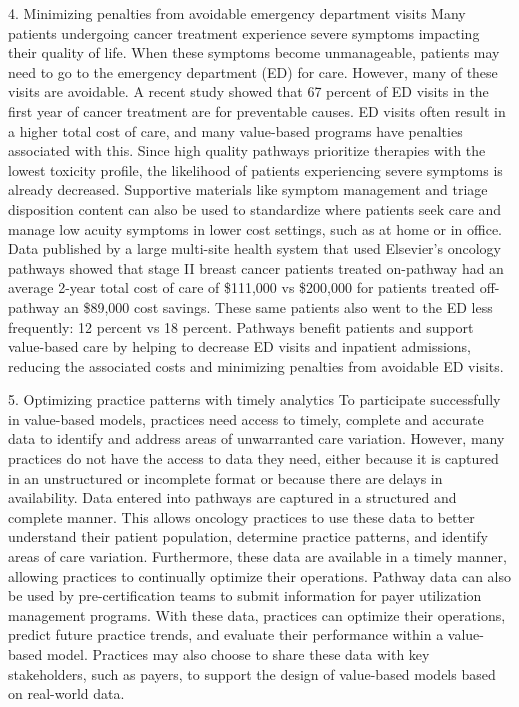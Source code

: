 4. Minimizing penalties from avoidable emergency department visits
Many patients
undergoing cancer treatment experience severe symptoms impacting their quality
of life. When these symptoms become unmanageable, patients may need to go to the
emergency department (ED) for care. However, many of these visits are avoidable.
A recent study showed that 67 percent of ED visits in the first year of cancer
treatment are for preventable causes. ED visits often result in a higher total
cost of care, and many value-based programs have penalties associated with this.
Since high quality pathways prioritize therapies with the lowest toxicity
profile, the likelihood of patients experiencing severe symptoms is already
decreased. Supportive materials like symptom management and triage disposition
content can also be used to standardize where patients seek care and manage low
acuity symptoms in lower cost settings, such as at home or in office. Data
published by a large multi-site health system that used Elsevier's oncology
pathways showed that stage II breast cancer patients treated on-pathway had an
average 2-year total cost of care of \$111,000 vs \$200,000 for patients treated
off-pathway an \$89,000 cost savings. These same patients also went to the ED
less frequently: 12 percent vs 18 percent.
Pathways benefit patients and support value-based care by helping to decrease ED
visits and inpatient admissions, reducing the associated costs and minimizing
penalties from avoidable ED visits.

5. Optimizing practice patterns with timely analytics
To participate successfully in value-based models, practices need access to timely, complete
and accurate data to identify and address areas of unwarranted care variation.
However, many practices do not have the access to data they need, either because
it is captured in an unstructured or incomplete format or because there are
delays in availability. Data entered into pathways are captured in a structured
and complete manner. This allows oncology practices to use these data to better
understand their patient population, determine practice patterns, and identify
areas of care variation. Furthermore, these data are available in a timely
manner, allowing practices to continually optimize their operations. Pathway
data can also be used by pre-certification teams to submit information for payer
utilization management programs.
With these data, practices can optimize their operations, predict future
practice trends, and evaluate their performance within a value-based model.
Practices may also choose to share these data with key stakeholders, such as
payers, to support the design of value-based models based on real-world data.

